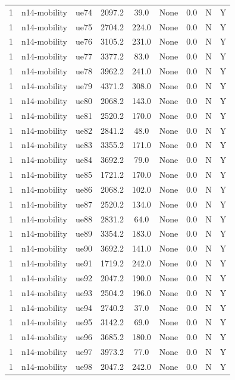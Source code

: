 \begin{table}[ht]
\begin{tabular}{|c|c|c|c|c|c|c|c|c|}
1 & n14-mobility & ue74 & 2097.2 & 39.0 & None & 0.0 & N & Y \\
1 & n14-mobility & ue75 & 2704.2 & 224.0 & None & 0.0 & N & Y \\
1 & n14-mobility & ue76 & 3105.2 & 231.0 & None & 0.0 & N & Y \\
1 & n14-mobility & ue77 & 3377.2 & 83.0 & None & 0.0 & N & Y \\
1 & n14-mobility & ue78 & 3962.2 & 241.0 & None & 0.0 & N & Y \\
1 & n14-mobility & ue79 & 4371.2 & 308.0 & None & 0.0 & N & Y \\
1 & n14-mobility & ue80 & 2068.2 & 143.0 & None & 0.0 & N & Y \\
1 & n14-mobility & ue81 & 2520.2 & 170.0 & None & 0.0 & N & Y \\
1 & n14-mobility & ue82 & 2841.2 & 48.0 & None & 0.0 & N & Y \\
1 & n14-mobility & ue83 & 3355.2 & 171.0 & None & 0.0 & N & Y \\
1 & n14-mobility & ue84 & 3692.2 & 79.0 & None & 0.0 & N & Y \\
1 & n14-mobility & ue85 & 1721.2 & 170.0 & None & 0.0 & N & Y \\
1 & n14-mobility & ue86 & 2068.2 & 102.0 & None & 0.0 & N & Y \\
1 & n14-mobility & ue87 & 2520.2 & 134.0 & None & 0.0 & N & Y \\
1 & n14-mobility & ue88 & 2831.2 & 64.0 & None & 0.0 & N & Y \\
1 & n14-mobility & ue89 & 3354.2 & 183.0 & None & 0.0 & N & Y \\
1 & n14-mobility & ue90 & 3692.2 & 141.0 & None & 0.0 & N & Y \\
1 & n14-mobility & ue91 & 1719.2 & 242.0 & None & 0.0 & N & Y \\
1 & n14-mobility & ue92 & 2047.2 & 190.0 & None & 0.0 & N & Y \\
1 & n14-mobility & ue93 & 2504.2 & 196.0 & None & 0.0 & N & Y \\
1 & n14-mobility & ue94 & 2740.2 & 37.0 & None & 0.0 & N & Y \\
1 & n14-mobility & ue95 & 3142.2 & 69.0 & None & 0.0 & N & Y \\
1 & n14-mobility & ue96 & 3685.2 & 180.0 & None & 0.0 & N & Y \\
1 & n14-mobility & ue97 & 3973.2 & 77.0 & None & 0.0 & N & Y \\
1 & n14-mobility & ue98 & 2047.2 & 242.0 & None & 0.0 & N & Y \\

\end{tabular}
\end{table}
